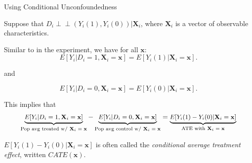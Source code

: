 \documentclass[11pt,english,handout]{beamer}
\newenvironment{wideitemize}{\itemize\addtolength{\itemsep}{10pt}}{\enditemize}
\newcommand{\indep}{\perp\!\!\!\!\perp}
\begin{document}
\begin{frame}{Using Conditional Unconfoundedness}
\vspace{0.2cm}
	\begin{wideitemize}
		\item
		Suppose that $D_i \indep (Y_i(1), Y_i(0)) | \mathbf{X}_i$, where $\mathbf{X}_i$ is a vector of observable characteristics. 
		
		\item
		Similar to in the experiment, we have for all $\mathbf{x}$:
		$$E[Y_i | D_i = 1,\mathbf{X}_i= \mathbf{x}] = E[Y_i(1) | \mathbf{X}_i=\mathbf{x}].$$
		
		and 
		
		$$E[Y_i | D_i = 0,\mathbf{X}_i = \mathbf{x}] = E[Y_i(0) | \mathbf{X}_i =\mathbf{x}].$$
		
		\pause
		\item
		This implies that
		$$\small \underbrace{E[Y_i | D_i = 1, \mathbf{X}_i= \mathbf{x}] }_{\text{Pop avg treated w/ $\mathbf{X}_i= \mathbf{x}$}}- \underbrace{E[Y_i | D_i = 0, \mathbf{X}_i= \mathbf{x}]}_{\text{Pop avg control w/ $\mathbf{X}_i= \mathbf{x}$}} = \underbrace{E[Y_i(1) - Y_i(0) | \mathbf{X}_i= \mathbf{x}]}_{\text{ATE with $\mathbf{X}_i= \mathbf{x}$}} $$ 
		
		\pause
		\item 
		$E[Y_i(1) - Y_i(0) | \mathbf{X}_i= \mathbf{x}]$ is often called the \textit{conditional average treatment effect}, written $CATE(\mathbf{x})$. 	
	\end{wideitemize}	
\end{frame}
\end{document}
